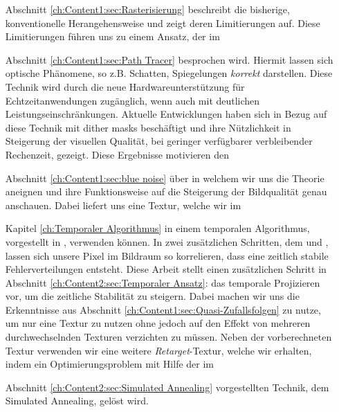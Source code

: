 \begin{itemize}
    \item[Abschnitt \ref{ch:Content1:sec:Rasterisierung}] beschreibt die bisherige, konventionelle Herangehensweise und zeigt deren Limitierungen auf. Diese 
        Limitierungen führen uns zu einem Ansatz, der im 

    \item[Abschnitt \ref{ch:Content1:sec:Path Tracer}] besprochen wird. Hiermit lassen sich optische Phänomene, so z.B. Schatten, Spiegelungen \textit{korrekt} darstellen.
        Diese Technik wird durch die neue Hardwareunterstützung für Echtzeitanwendungen zugänglich, wenn auch mit deutlichen Leistungseinschränkungen.
        Aktuelle Entwicklungen \cite{georgiev2016blue} haben sich in Bezug auf diese Technik mit  dither masks beschäftigt
        und ihre Nützlichkeit in Steigerung der visuellen Qualität, bei geringer verfügbarer verbleibender Rechenzeit, gezeigt. Diese Ergebnisse motivieren den

    \item[Abschnitt \ref{ch:Content1:sec:blue noise}] über  in welchem wir uns die Theorie aneignen und ihre Funktionsweise auf die Steigerung der 
        Bildqualität genau anschauen. Dabei liefert uns \cite{bluenoisechrisschied} eine  Textur, welche wir im

    \item[Kapitel \ref{ch:Temporaler Algorithmus}]in einem temporalen Algorithmus, vorgestellt in \cite{hal02158423}, verwenden können. In zwei zusätzlichen Schritten, dem 
     und , lassen sich unsere Pixel im Bildraum so korrelieren, dass eine zeitlich stabile Fehlerverteilungen
    entsteht. Diese Arbeit stellt einen zusätzlichen Schritt in Abschnitt \ref{ch:Content2:sec:Temporaler Ansatz}: das temporale Projizieren vor, um die zeitliche Stabilität zu steigern. 
    Dabei machen wir uns die Erkenntnisse aus Abschnitt \ref{ch:Content1:sec:Quasi-Zufallsfolgen} zu nutze, um nur eine Textur zu nutzen ohne jedoch auf den Effekt von mehreren durchwechselnden
    Texturen verzichten zu müssen. Neben der vorberechneten  Textur verwenden wir eine weitere \textit{Retarget}-Textur, welche wir erhalten, 
    indem ein Optimierungsproblem mit Hilfe der im  

    \item[Abschnitt \ref{ch:Content2:sec:Simulated Annealing}]vorgestellten Technik, dem Simulated Annealing, gelöst wird.   

\end{itemize}
 
